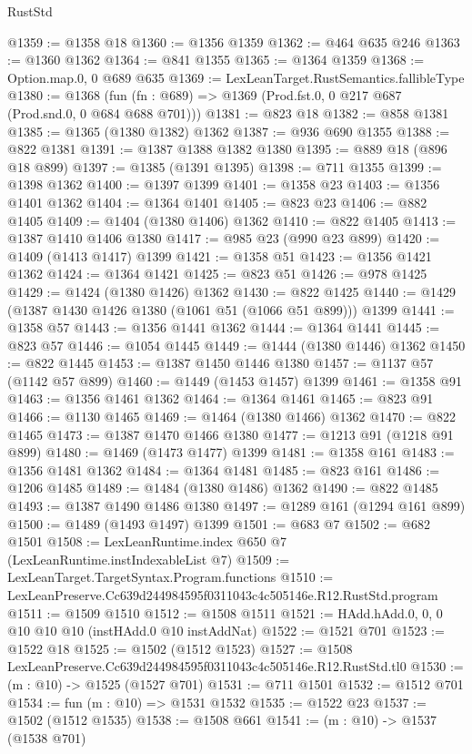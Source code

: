 \begin{lexlean}{RustStd}
\begin{coremodule}
@1359 := @1358 @18
@1360 := @1356 @1359
@1362 := @464 @635 @246
@1363 := @1360 @1362
@1364 := @841 @1355
@1365 := @1364 @1359
@1368 := Option.map.{0, 0} @689 @635
@1369 := LexLeanTarget.RustSemantics.fallibleType
@1380 := @1368
    (fun (fn : @689) => @1369 (Prod.fst.{0, 0} @217 @687 (Prod.snd.{0, 0} @684 @688 @701)))
@1381 := @823 @18
@1382 := @858 @1381
@1385 := @1365 (@1380 @1382) @1362
@1387 := @936 @690 @1355
@1388 := @822 @1381
@1391 := @1387 @1388 @1382 @1380
@1395 := @889 @18 (@896 @18 @899)
@1397 := @1385 (@1391 @1395)
@1398 := @711 @1355
@1399 := @1398 @1362
@1400 := @1397 @1399
@1401 := @1358 @23
@1403 := @1356 @1401 @1362
@1404 := @1364 @1401
@1405 := @823 @23
@1406 := @882 @1405
@1409 := @1404 (@1380 @1406) @1362
@1410 := @822 @1405
@1413 := @1387 @1410 @1406 @1380
@1417 := @985 @23 (@990 @23 @899)
@1420 := @1409 (@1413 @1417) @1399
@1421 := @1358 @51
@1423 := @1356 @1421 @1362
@1424 := @1364 @1421
@1425 := @823 @51
@1426 := @978 @1425
@1429 := @1424 (@1380 @1426) @1362
@1430 := @822 @1425
@1440 := @1429 (@1387 @1430 @1426 @1380 (@1061 @51 (@1066 @51 @899))) @1399
@1441 := @1358 @57
@1443 := @1356 @1441 @1362
@1444 := @1364 @1441
@1445 := @823 @57
@1446 := @1054 @1445
@1449 := @1444 (@1380 @1446) @1362
@1450 := @822 @1445
@1453 := @1387 @1450 @1446 @1380
@1457 := @1137 @57 (@1142 @57 @899)
@1460 := @1449 (@1453 @1457) @1399
@1461 := @1358 @91
@1463 := @1356 @1461 @1362
@1464 := @1364 @1461
@1465 := @823 @91
@1466 := @1130 @1465
@1469 := @1464 (@1380 @1466) @1362
@1470 := @822 @1465
@1473 := @1387 @1470 @1466 @1380
@1477 := @1213 @91 (@1218 @91 @899)
@1480 := @1469 (@1473 @1477) @1399
@1481 := @1358 @161
@1483 := @1356 @1481 @1362
@1484 := @1364 @1481
@1485 := @823 @161
@1486 := @1206 @1485
@1489 := @1484 (@1380 @1486) @1362
@1490 := @822 @1485
@1493 := @1387 @1490 @1486 @1380
@1497 := @1289 @161 (@1294 @161 @899)
@1500 := @1489 (@1493 @1497) @1399
@1501 := @683 @7
@1502 := @682 @1501
@1508 := LexLeanRuntime.index @650 @7 (LexLeanRuntime.instIndexableList @7)
@1509 := LexLeanTarget.TargetSyntax.Program.functions
@1510 := LexLeanPreserve.Cc639d244984595f0311043c4c505146e.R12.RustStd.program
@1511 := @1509 @1510
@1512 := @1508 @1511
@1521 := HAdd.hAdd.{0, 0, 0} @10 @10 @10 (instHAdd.{0} @10 instAddNat)
@1522 := @1521 @701
@1523 := @1522 @18
@1525 := @1502 (@1512 @1523)
@1527 := @1508 LexLeanPreserve.Cc639d244984595f0311043c4c505146e.R12.RustStd.tl0
@1530 := (m : @10) -> @1525 (@1527 @701)
@1531 := @711 @1501
@1532 := @1512 @701
@1534 := fun (m : @10) => @1531 @1532
@1535 := @1522 @23
@1537 := @1502 (@1512 @1535)
@1538 := @1508 @661
@1541 := (m : @10) -> @1537 (@1538 @701)

\end{coremodule}
\end{lexlean}
